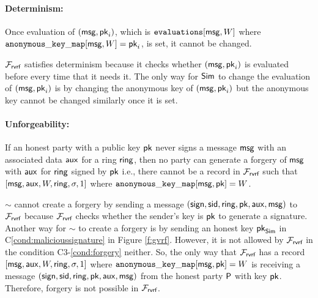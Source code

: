 \paragraph{Determinism:} Once evaluation of $ (\mathsf{msg}, \mathsf{pk}_i) $, which is $ \texttt{evaluations}[\mathsf{msg},W] $ where $ \mathtt{anonymous\_key\_map}[\mathsf{msg},W] = \mathsf{pk}_i $, is set, it cannot be changed. 

$ \mathcal{F}_{\textsf{rvrf}} $ satisfies determinism because it checks whether $ (\mathsf{msg}, \mathsf{pk}_i) $ is evaluated before every time that it needs it. The only way for $ \mathsf{Sim} $ to change the evaluation of $ (\mathsf{msg}, \mathsf{pk}_i) $ is by changing the anonymous key of $ (\mathsf{msg}, \mathsf{pk}_i)  $ but the anonymous key cannot be changed similarly once it is set.

\paragraph{Unforgeability:}  If an honest party with a public key $ \mathsf{pk} $ never signs a message $ \mathsf{msg} $  with an associated data $ \mathsf{aux} $ for a ring $ \mathsf{ring} $, then no party can generate a  forgery of $ \mathsf{msg} $ with $ \mathsf{aux} $ for $ \mathsf{ring} $ signed by $ \mathsf{pk} $ i.e., there cannot be a record in $ \mathcal{F}_{\textsf{rvrf}} $ such that $ [\mathsf{msg}, \mathsf{aux},W,\mathsf{ring}, \sigma, 1] $ where $ \mathtt{anonymous\_key\_map}[\mathsf{msg},\mathsf{pk}] = W $.

$ \sim $ cannot create a forgery by sending a message $ (\mathsf{sign}, \textsf{sid},\mathsf{ring},\mathsf{pk},\mathsf{aux},\mathsf{msg}) $ to $ \mathcal{F}_{\textsf{rvrf}} $ because $ \mathcal{F}_{\textsf{rvrf}} $ checks whether the sender's key is $ \mathsf{pk} $ to generate a signature. Another way for $ \sim $ to create a forgery is by sending an honest key $ \mathsf{pk}_{\mathsf{Sim}} $  in C\ref{cond:malicioussignature} in Figure \ref{f:gvrf}. However, it is not allowed by $ \mathcal{F}_{\textsf{rvrf}} $ in the condition C3-\ref{cond:forgery} neither. So, the only way that $ \mathcal{F}_{\textsf{rvrf}} $ has a record $ [\mathsf{msg}, \mathsf{aux},W,\mathsf{ring}, \sigma, 1] $ where $ \mathtt{anonymous\_key\_map}[\mathsf{msg},\mathsf{pk}] = W $ is receiving a message $ (\mathsf{sign}, \textsf{sid},\mathsf{ring},\mathsf{pk},\mathsf{aux},\mathsf{msg})  $ from the honest party $\mathsf{P}  $ with key $ \mathsf{pk} $. Therefore, forgery is not possible in $ \mathcal{F}_{\textsf{rvrf}} $.

